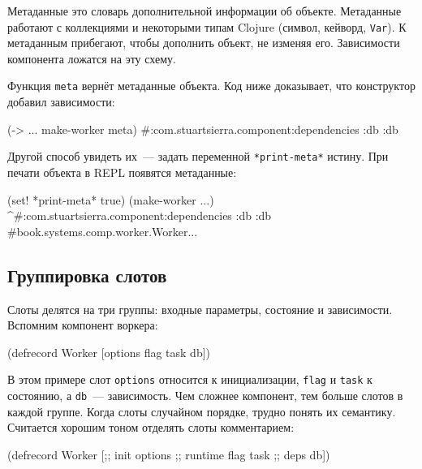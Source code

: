 Метаданные это словарь дополнительной информации об объекте. Метаданные работают
с коллекциями и некоторыми типам Clojure (символ, кейворд, \verb|Var|). К
метаданным прибегают, чтобы дополнить объект, не изменяя его. Зависимости
компонента ложатся на эту схему.

Функция \verb|meta| вернёт метаданные объекта. Код ниже доказывает, что
конструктор добавил зависимости:

\begin{english}
  \begin{clojure}
(-> {...} make-worker meta)
#:com.stuartsierra.component{:dependencies {:db :db}}
  \end{clojure}
\end{english}

Другой способ увидеть их~--- задать переменной \verb|*print-meta*| истину. При
печати объекта в REPL появятся метаданные:


\begin{english}
  \begin{clojure}
(set! *print-meta* true)
(make-worker {...})
^#:com.stuartsierra.component{:dependencies {:db :db}}
#book.systems.comp.worker.Worker{...}
  \end{clojure}
\end{english}

\subsection{Группировка слотов}


Слоты делятся на три группы: входные параметры, состояние и
зависимости. Вспомним компонент воркера:

\begin{english}
  \begin{clojure}
(defrecord Worker
    [options flag task db])
  \end{clojure}
\end{english}

В этом примере слот \verb|options| относится к инициализации, \verb|flag| и
\verb|task| к состоянию, а \verb|db|~--- зависимость. Чем сложнее компонент,
тем больше слотов в каждой группе. Когда слоты случайном порядке, трудно понять
их семантику. Считается хорошим тоном отделять слоты комментарием:

\begin{english}
  \begin{clojure}
(defrecord Worker
    [;; init
     options
     ;; runtime
     flag
     task
     ;; deps
     db])
  \end{clojure}
\end{english}

